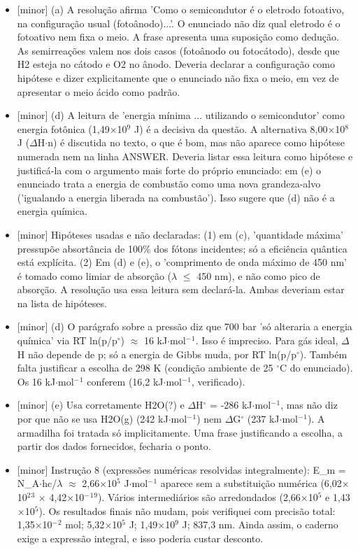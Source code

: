 \documentclass{article}%
\begin{document}
\begin{itemize}%
\item%
{[}minor{]} (a) A resolução afirma 'Como o semicondutor é o eletrodo fotoativo, na configuração usual (fotoânodo)...'. O enunciado não diz qual eletrodo é o fotoativo nem fixa o meio. A frase apresenta uma suposição como dedução. As semirreações valem nos dois casos (fotoânodo ou fotocátodo), desde que H2 esteja no cátodo e O2 no ânodo. Deveria declarar a configuração como hipótese e dizer explicitamente que o enunciado não fixa o meio, em vez de apresentar o meio ácido como padrão.%
\item%
{[}minor{]} (d) A leitura de 'energia mínima ... utilizando o semicondutor' como energia fotônica (1,49$\times$10$^{9}$ J) é a decisiva da questão. A alternativa 8,00$\times$10$^{8}$ J ($\Delta$H$\cdot$n) é discutida no texto, o que é bom, mas não aparece como hipótese numerada nem na linha ANSWER. Deveria listar essa leitura como hipótese e justificá{-}la com o argumento mais forte do próprio enunciado: em (e) o enunciado trata a energia de combustão como uma nova grandeza{-}alvo ('igualando a energia liberada na combustão'). Isso sugere que (d) não é a energia química.%
\item%
{[}minor{]} Hipóteses usadas e não declaradas: (1) em (c), 'quantidade máxima' pressupõe absortância de 100\% dos fótons incidentes; só a eficiência quântica está explícita. (2) Em (d) e (e), o 'comprimento de onda máximo de 450 nm' é tomado como limiar de absorção ($\lambda$ $\leq$ 450 nm), e não como pico de absorção. A resolução usa essa leitura sem declará{-}la. Ambas deveriam estar na lista de hipóteses.%
\item%
{[}minor{]} (d) O parágrafo sobre a pressão diz que 700 bar 'só alteraria a energia química' via RT ln(p/p$^\circ$) $\approx$ 16 kJ$\cdot$mol$^{-}$$^{1}$. Isso é impreciso. Para gás ideal, $\Delta$H não depende de p; só a energia de Gibbs muda, por RT ln(p/p$^\circ$). Também falta justificar a escolha de 298 K (condição ambiente de 25 $^\circ$C do enunciado). Os 16 kJ$\cdot$mol$^{-}$$^{1}$ conferem (16,2 kJ$\cdot$mol$^{-}$$^{1}$, verificado).%
\item%
{[}minor{]} (e) Usa corretamente H2O(?) e $\Delta$H$^\circ$ = -286 kJ$\cdot$mol$^{-}$$^{1}$, mas não diz por que não se usa H2O(g) (242 kJ$\cdot$mol$^{-}$$^{1}$) nem $\Delta$G$^\circ$ (237 kJ$\cdot$mol$^{-}$$^{1}$). A armadilha foi tratada só implicitamente. Uma frase justificando a escolha, a partir dos dados fornecidos, fecharia o ponto.%
\item%
{[}minor{]} Instrução 8 (expressões numéricas resolvidas integralmente): E\_m = N\_A$\cdot$hc/$\lambda$ $\approx$ 2,66$\times$10$^{5}$ J$\cdot$mol$^{-}$$^{1}$ aparece sem a substituição numérica (6,02$\times$10$^2$$^3$ $\times$ 4,42$\times$10$^{-}$$^{1}$$^{9}$). Vários intermediários são arredondados (2,66$\times$10$^{5}$ e 1,43$\times$10$^{5}$). Os resultados finais não mudam, pois verifiquei com precisão total: 1,35$\times$10$^{-}$$^2$ mol; 5,32$\times$10$^{5}$ J; 1,49$\times$10$^{9}$ J; 837,3 nm. Ainda assim, o caderno exige a expressão integral, e isso poderia custar desconto.%
\end{itemize}%
\end{document}
